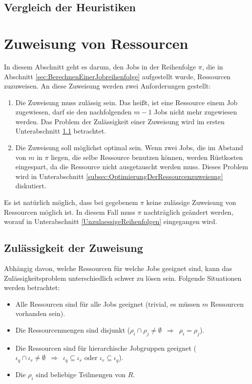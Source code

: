 \documentclass{scrreprt}
\begin{document}
\subsection{Vergleich der Heuristiken}


\section{Zuweisung von Ressourcen}
\label{sec:ZuweisungVonRessourcen}
In diesem Abschnitt geht es darum, den Jobs in der Reihenfolge $\pi$, die in Abschnitt \ref{sec:BerechnenEinerJobreihenfolge} aufgestellt wurde,
Ressourcen zuzuweisen. An diese Zuweisung werden zwei Anforderungen gestellt:
\begin{enumerate}
    \item Die Zuweisung muss zulässig sein. Das heißt, ist eine Ressource einem Job zugewiesen, darf sie den nachfolgenden $m-1$ Jobs nicht mehr zugewiesen werden.
        Das Problem der Zulässigkeit einer Zuweisung wird im ersten Unterabschnitt \ref{subsec:ZulaessigkeitDerZuweisung} betrachtet.
    \item Die Zuweisung soll möglichst optimal sein. Wenn zwei Jobs, die im Abstand von $m$ in $\pi$ liegen, die selbe Ressource benutzen können,
        werden Rüstkosten eingespart, da die Ressource nicht ausgetauscht werden muss.
        Dieses Problem wird in Unterabschnitt \ref{subsec:OptimierungDerRessourcenzuweisung} diskutiert.
\end{enumerate}
Es ist natürlich möglich, dass bei gegebenem $\pi$ keine zulässige Zuweisung von Ressourcen möglich ist.
In diesem Fall muss $\pi$ nachträglich geändert werden, worauf in Unterabschnitt \ref{UnzulaessigeReihenfolgen} eingegangen wird.

\subsection{Zulässigkeit der Zuweisung}
\label{subsec:ZulaessigkeitDerZuweisung}
Abhängig davon, welche Ressourcen für welche Jobs geeignet sind, kann das Zulässigkeitsproblem unterschiedlich schwer zu lösen sein.
Folgende Situationen werden betrachtet:
\begin{itemize}
    \item Alle Ressourcen sind für alle Jobs geeignet (trivial, es müssen $m$ Ressourcen vorhanden sein).
    \item Die Ressourcenmengen sind disjunkt ($\rho_i\cap\rho_j \neq \emptyset \enspace \Rightarrow \enspace \rho_i = \rho_j$).
    \item Die Ressourcen sind für hierarchische Jobgruppen geeignet 
        ($\iota_q\cap\iota_r \neq \emptyset \enspace \Rightarrow \enspace \iota_q\subseteq\iota_r$ oder $\iota_r\subseteq\iota_q$).
    \item Die $\rho_i$ sind beliebige Teilmengen von $R$.
\end{itemize}
\end{document}
